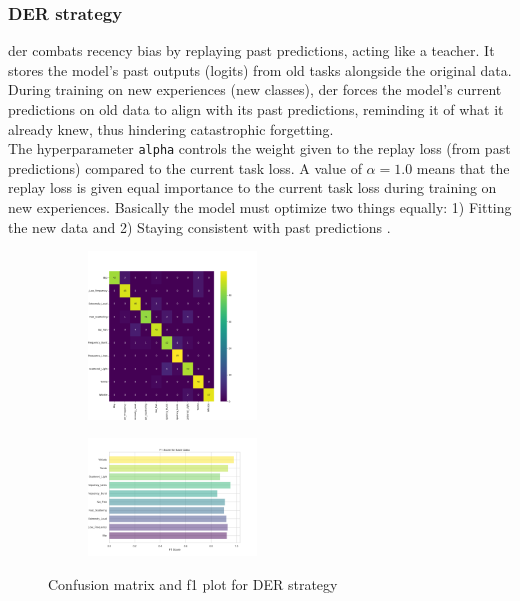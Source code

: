 \subsubsection{DER strategy}
\label{subsubsec:RQ1_DER}
\acrfull{der} combats recency bias by replaying past predictions, acting like a teacher. It stores the model's past outputs (logits) from old tasks alongside the original data. During training on new experiences (new classes), \acrshort{der} forces the model's current predictions on old data to align with its past predictions, reminding it of what it already knew, thus hindering catastrophic forgetting. \\
The hyperparameter \verb|alpha| controls the weight given to the replay loss (from past predictions) compared to the current task loss. A value of $\alpha = 1.0$ means that the replay loss is given equal importance to the current task loss during training on new experiences. Basically the model must optimize two things equally: 1) Fitting the new data and 2) Staying consistent with past predictions \citep{buzzega2020dark}.
\begin{figure}[H]
\centering
\begin{subfigure}
  \centering
  \includegraphics[width=0.49\textwidth]{Images/cm_DER_MultiView_100epochs.png}  
  \label{fig:sub-first5}
\end{subfigure}
\begin{subfigure}
  \centering
  \includegraphics[width=0.49\textwidth]{Images/f1_DER_MultiView_100epochs.png}  
  \label{fig:sub-second5}
\end{subfigure}
\caption{Confusion matrix and f1 plot for DER strategy}
\label{fig:cm_f1_der_baseline}
\end{figure}
